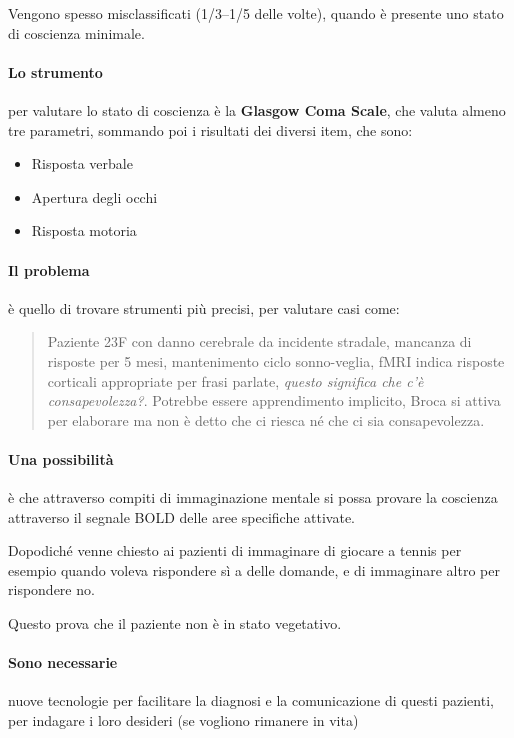 \documentclass[12pt, a4paper]{article}
\begin{document}
Vengono spesso misclassificati (1/3--1/5 delle volte), quando \`e presente uno stato di coscienza minimale.

\paragraph{Lo strumento} per valutare lo stato di coscienza \`e la \textbf{Glasgow Coma Scale}, che valuta almeno tre parametri, sommando poi i risultati dei diversi item, che sono:

\begin{itemize}
    \item Risposta verbale
    \item Apertura degli occhi
    \item Risposta motoria
\end{itemize}

\paragraph{Il problema} \`e quello di trovare strumenti pi\`u precisi, per valutare casi come:

\begin{quote}
    Paziente 23F con danno cerebrale da incidente stradale, mancanza di risposte per 5 mesi, mantenimento ciclo sonno-veglia, fMRI indica risposte corticali appropriate per frasi parlate, \emph{questo significa che c'\`e consapevolezza?}. Potrebbe essere apprendimento implicito, Broca si attiva per elaborare ma non \`e detto che ci riesca n\'e che ci sia consapevolezza.
\end{quote}

\paragraph{Una possibilit\`a} \`e che attraverso compiti di immaginazione mentale si possa provare la coscienza attraverso il segnale BOLD delle aree specifiche attivate.

Dopodich\'e venne chiesto ai pazienti di immaginare di giocare a tennis per esempio quando voleva rispondere s\`i a delle domande, e di immaginare altro per rispondere no.

Questo prova che il paziente non \`e in stato vegetativo.

\paragraph{Sono necessarie} nuove tecnologie per facilitare la diagnosi e la comunicazione di questi pazienti, per indagare i loro desideri (se vogliono rimanere in vita)
\end{document}
